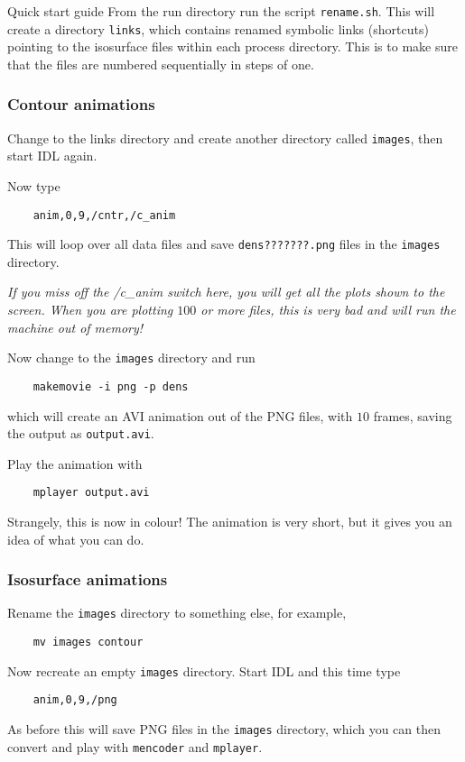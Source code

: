 \begin{chapter}{\label{cha:quickstart} Quick start guide}
  From the run directory run the script \verb"rename.sh".  This will create a
  directory \verb"links", which contains renamed symbolic links (shortcuts)
  pointing to the isosurface files within each process directory.  This is to
  make sure that the files are numbered sequentially in steps of one.

  \subsubsection{Contour animations}
  Change to the links directory and create another directory called
  \verb"images", then start IDL again.

  Now type
  \begin{Verbatim}
    anim,0,9,/cntr,/c_anim
  \end{Verbatim}
  This will loop over all data files and save \verb"dens???????.png" files in
  the \verb"images" directory.

  \emph{If you miss off the /c\_anim switch here, you will get all the
  plots shown to the screen.  When you are plotting $100$ or more files, this
  is very bad and will run the machine out of memory!}

  Now change to the \verb"images" directory and run
  \begin{Verbatim}
    makemovie -i png -p dens
  \end{Verbatim}
  which will create an AVI animation out of the PNG files, with $10$ frames,
  saving the output as \verb"output.avi".

  Play the animation with
  \begin{Verbatim}
    mplayer output.avi
  \end{Verbatim}
  Strangely, this is now in colour!  The animation is very short, but it gives
  you an idea of what you can do.

  \subsubsection{Isosurface animations}
  Rename the \verb"images" directory to something else, for example,
  \begin{Verbatim}
    mv images contour
  \end{Verbatim}
  Now recreate an empty \verb"images" directory.  Start IDL and this time type
  \begin{Verbatim}
    anim,0,9,/png
  \end{Verbatim}
  As before this will save PNG files in the \verb"images" directory, which you
  can then convert and play with \verb"mencoder" and \verb"mplayer".


\end{chapter}
